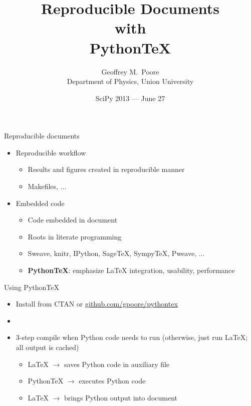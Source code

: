 \documentclass[xcolor=svgnames,11pt, utf8]{beamer}
\title{Reproducible Documents \\ {\normalsize with} \\ \textbf{PythonTeX} }
\author{Geoffrey M.\ Poore\\ {\footnotesize Department of Physics, Union University}}
\date{\small SciPy 2013 --- June 27}
\begin{document}
\begin{frame}
\maketitle
\end{frame}




\begin{frame}{Reproducible documents}
\begin{itemize}
\item Reproducible workflow
    \begin{itemize}
    \item Results and figures created in reproducible manner
    \item Makefiles, ...
    \end{itemize}
\pause
\item Embedded code
    \begin{itemize}
    \item Code embedded in document
    \item Roots in literate programming
    \item Sweave, knitr, IPython, SageTeX, SympyTeX, Pweave, ...
    \pause
    \item \textbf{PythonTeX}:  emphasize LaTeX integration, usability, performance
    \end{itemize}
\end{itemize}
\end{frame}





\begin{frame}[fragile=singleslide]{Using PythonTeX}
\begin{itemize}
\item Install from CTAN or \url{github.com/gpoore/pythontex}
\item {}
\item 3-step compile when Python code needs to run (otherwise, just run LaTeX; all output is cached)
    \begin{itemize}
    \item LaTeX $\rightarrow$ saves Python code in auxiliary file
    \item PythonTeX $\rightarrow$ executes Python code
    \item LaTeX $\rightarrow$ brings Python output into document
    \end{itemize}
\end{itemize}
\end{frame}
\end{document}
